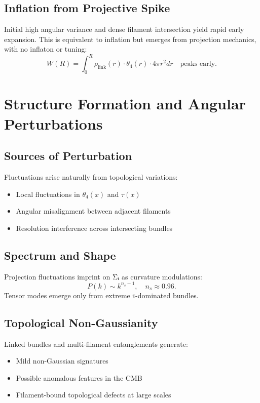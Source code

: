 \subsection{Inflation from Projective Spike}
Initial high angular variance and dense filament intersection yield rapid early expansion. This is equivalent to inflation but emerges from projection mechanics, with no inflaton or tuning:
\[
W(R) = \int_0^R \rho_{\text{link}}(r) \cdot \theta_4(r) \cdot 4\pi r^2 dr \quad \text{peaks early.}
\]

\section{Structure Formation and Angular Perturbations}

\subsection{Sources of Perturbation}
Fluctuations arise naturally from topological variations:
\begin{itemize}
  \item Local fluctuations in $\theta_4(x)$ and $\tau(x)$
  \item Angular misalignment between adjacent filaments
  \item Resolution interference across intersecting bundles
\end{itemize}

\subsection{Spectrum and Shape}
Projection fluctuations imprint on Σₜ as curvature modulations:
\[
P(k) \sim k^{n_s - 1}, \quad n_s \approx 0.96.
\]
Tensor modes emerge only from extreme τ-dominated bundles.

\subsection{Topological Non-Gaussianity}
Linked bundles and multi-filament entanglements generate:
\begin{itemize}
  \item Mild non-Gaussian signatures
  \item Possible anomalous features in the CMB
  \item Filament-bound topological defects at large scales
\end{itemize}

